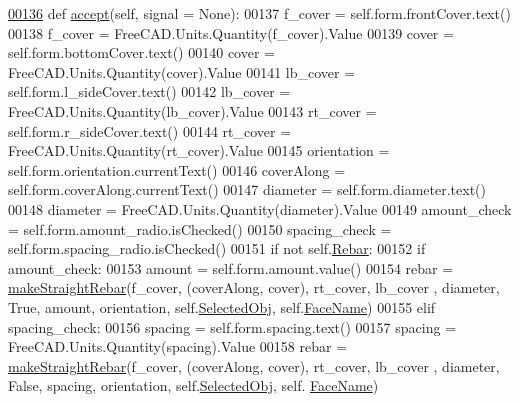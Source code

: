 \begin{DoxyCode}
\hypertarget{classStraightRebar_1_1__StraightRebarTaskPanel.tex_l00136}{}\hyperlink{classStraightRebar_1_1__StraightRebarTaskPanel_ad8a49d3d30ef3308b8386c9ebe1b67d8}{00136}     \textcolor{keyword}{def }\hyperlink{classStraightRebar_1_1__StraightRebarTaskPanel_ad8a49d3d30ef3308b8386c9ebe1b67d8}{accept}(self, signal = None):
00137         f\_cover = self.form.frontCover.text()
00138         f\_cover = FreeCAD.Units.Quantity(f\_cover).Value
00139         cover = self.form.bottomCover.text()
00140         cover = FreeCAD.Units.Quantity(cover).Value
00141         lb\_cover = self.form.l\_sideCover.text()
00142         lb\_cover = FreeCAD.Units.Quantity(lb\_cover).Value
00143         rt\_cover = self.form.r\_sideCover.text()
00144         rt\_cover = FreeCAD.Units.Quantity(rt\_cover).Value
00145         orientation = self.form.orientation.currentText()
00146         coverAlong = self.form.coverAlong.currentText()
00147         diameter = self.form.diameter.text()
00148         diameter = FreeCAD.Units.Quantity(diameter).Value
00149         amount\_check = self.form.amount\_radio.isChecked()
00150         spacing\_check = self.form.spacing\_radio.isChecked()
00151         \textcolor{keywordflow}{if} \textcolor{keywordflow}{not} self.\hyperlink{classStraightRebar_1_1__StraightRebarTaskPanel_a23fe17475277eae59cbed538f0f183cb}{Rebar}:
00152             \textcolor{keywordflow}{if} amount\_check:
00153                 amount = self.form.amount.value()
00154                 rebar = \hyperlink{namespaceStraightRebar_af6270367d7beae457813e33718d80faf}{makeStraightRebar}(f\_cover, (coverAlong, cover), rt\_cover, lb\_cover
      , diameter, \textcolor{keyword}{True}, amount, orientation, self.\hyperlink{classStraightRebar_1_1__StraightRebarTaskPanel_a4bdbe85e1cc468f34a907db99faebe85}{SelectedObj}, self.\hyperlink{classStraightRebar_1_1__StraightRebarTaskPanel_afe733532cc15a149f9ba8f7da4515413}{FaceName})
00155             \textcolor{keywordflow}{elif} spacing\_check:
00156                 spacing = self.form.spacing.text()
00157                 spacing = FreeCAD.Units.Quantity(spacing).Value
00158                 rebar = \hyperlink{namespaceStraightRebar_af6270367d7beae457813e33718d80faf}{makeStraightRebar}(f\_cover, (coverAlong, cover), rt\_cover, lb\_cover
      , diameter, \textcolor{keyword}{False}, spacing, orientation, self.\hyperlink{classStraightRebar_1_1__StraightRebarTaskPanel_a4bdbe85e1cc468f34a907db99faebe85}{SelectedObj}, self.
      \hyperlink{classStraightRebar_1_1__StraightRebarTaskPanel_afe733532cc15a149f9ba8f7da4515413}{FaceName})

\end{DoxyCode}
